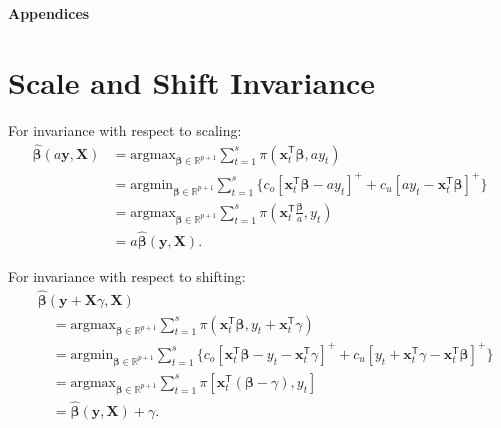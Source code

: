 \documentclass{article}
\begin{document}
\newpage
\begin{center}
{\bf\Large Appendices}
\end{center}

\appendix

\section{Scale and Shift Invariance}
\label{app:A}

For invariance with respect to scaling:
\[
    \begin{aligned}
        \hat{\boldsymbol{\beta}}(a\mathbf{y},\mathbf{X})
        &=\text{argmax}_{\boldsymbol{\beta}\in \mathbb{R}^{p+1}}\displaystyle\sum_{t=1}^s{\pi(\mathbf{x}_t^{\mathsf{T}}\boldsymbol{\beta},ay_t)}\\
        &=\text{argmin}_{\boldsymbol{\beta}\in \mathbb{R}^{p+1}}\displaystyle\sum_{t=1}^s{\{c_o[\mathbf{x}_t^{\mathsf{T}}\boldsymbol{\beta}-ay_t]^{+}+c_u[ay_t-\mathbf{x}_t^{\mathsf{T}}\boldsymbol{\beta}]^{+}\}}\\
        &=\text{argmax}_{\boldsymbol{\beta}\in \mathbb{R}^{p+1}}\displaystyle\sum_{t=1}^s{\pi\left(\mathbf{x}_t^{\mathsf{T}}\frac{\boldsymbol{\beta}}{a},y_t\right)}\\
        &=a\hat{\boldsymbol{\beta}}(\mathbf{y},\mathbf{X}).
    \end{aligned}
\]

\noindent
For invariance with respect to shifting:
\[
    \begin{aligned}
        &\hat{\boldsymbol{\beta}}(\mathbf{y}+\mathbf{X}\gamma,\mathbf{X})\\
        &\quad=\text{argmax}_{\boldsymbol{\beta}\in \mathbb{R}^{p+1}}\displaystyle\sum_{t=1}^s{\pi(\mathbf{x}_t^{\mathsf{T}}\boldsymbol{\beta},y_t+\mathbf{x}_t^{\mathsf{T}}\gamma)}\\
        &\quad=\text{argmin}_{\boldsymbol{\beta}\in \mathbb{R}^{p+1}}\displaystyle\sum_{t=1}^s{\{c_o[\mathbf{x}_t^{\mathsf{T}}\boldsymbol{\beta}-y_t-\mathbf{x}_t^{\mathsf{T}}\gamma]^{+}+c_u[y_t+\mathbf{x}_t^{\mathsf{T}}\gamma-\mathbf{x}_t^{\mathsf{T}}\boldsymbol{\beta}]^{+}\}}\\
        &\quad=\text{argmax}_{\boldsymbol{\beta}\in \mathbb{R}^{p+1}}\displaystyle\sum_{t=1}^s{\pi[\mathbf{x}_t^{\mathsf{T}}(\boldsymbol{\beta}-\gamma),y_t]}\\
        &\quad=\hat{\boldsymbol{\beta}}(\mathbf{y},\mathbf{X})+\gamma.
    \end{aligned}
\]
\end{document}
